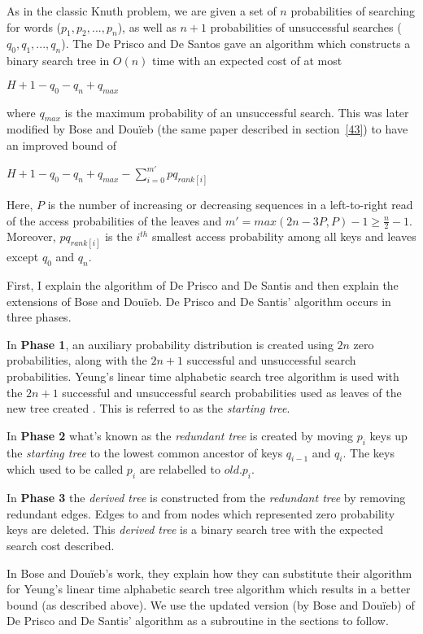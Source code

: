 \documentclass[letterpaper,12pt,titlepage,oneside,final]{book}
\theoremstyle{plain}
\begin{document}
As in the classic Knuth problem, we are given a set of $n$ probabilities of searching for words ($p_1, p_2, ..., p_n$), as well as $n+1$ probabilities of unsuccessful searches ($q_0, q_1, ..., q_n$). The De Prisco and De Santos gave an algorithm which constructs a binary search tree in $O(n)$ time with an expected cost of at most \cite{de1993binary}
\begin{center}
$H+1-q_0-q_n+q_{max}$
\end{center}  where $q_{max}$ is the maximum probability of an unsuccessful search. This was later modified by Bose and Dou\"{i}eb (the same paper described in section~\ref{43}) to have an improved bound of \cite{bose2009efficient}
\begin{center}
$H + 1 - q_0 - q_n + q_{max} - \sum_{i=0}^{m'} pq_{rank[i]}$
\end{center}
Here, $P$ is the number of increasing or decreasing sequences in a left-to-right read of the access probabilities of the leaves and $m'=max({2n-3P,P})-1 \geq \frac{n}{2} - 1$.  Moreover, $pq_{rank[i]}$ is the $i^{th}$ smallest access probability among all keys and leaves except $q_0$ and $q_n$.

First, I explain the algorithm of De Prisco and De Santis and then explain the extensions of Bose and Dou\"{i}eb. De Prisco and De Santis' algorithm occurs in three phases.

In \textbf{Phase 1}, an auxiliary probability distribution is created using $2n$ zero probabilities, along with the $2n+1$ successful and unsuccessful search probabilities. Yeung's linear time alphabetic search tree algorithm is used with the $2n+1$ successful and unsuccessful search probabilities used as leaves of the new tree created \cite{yeung1991alphabetic}. This is referred to as the \textit{starting tree}.

In \textbf{Phase 2} what's known as the \textit{redundant tree} is created by moving $p_i$ keys up the \textit{starting tree} to the lowest common ancestor of keys $q_{i-1}$ and $q_i$. The keys which used to be called $p_i$ are relabelled to $old.p_i$.

In \textbf{Phase 3} the \textit{derived tree} is constructed from the \textit{redundant tree} by removing redundant edges. Edges to and from nodes which represented zero probability keys are deleted. This \textit{derived tree} is a binary search tree with the expected search cost described.

In Bose and Dou\"{i}eb's work, they explain how they can substitute their algorithm for Yeung's linear time alphabetic search tree algorithm which results in a better bound (as described above). We use the updated version (by Bose and Dou\"{i}eb) of De Prisco and De Santis' algorithm as a subroutine in the sections to follow.
\end{document}
